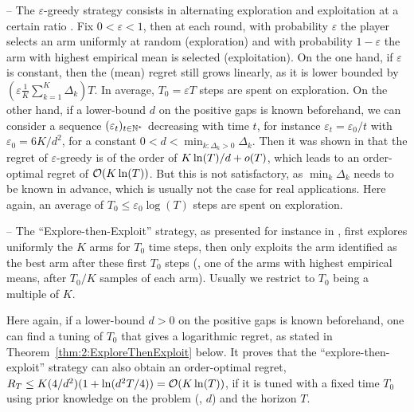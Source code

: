 -- The \textcolor{deeppurple}{$\varepsilon$-greedy strategy} consists in alternating exploration and exploitation at a certain ratio \cite{Auer02}.
Fix $0<\varepsilon<1$, then at each round, with probability $\varepsilon$ the player selects an arm uniformly at random (exploration) and with probability $1-\varepsilon$ the arm with highest empirical mean is selected (exploitation).
On the one hand, if $\varepsilon$ is constant, then the (mean) regret still grows linearly, as it is lower bounded by $(\varepsilon \frac{1}{K} \sum_{k=1}^K \Delta_k) T$.
In average, $T_0 = \varepsilon T$ steps are spent on exploration.
%
On the other hand, if a lower-bound $d$ on the positive gaps is known beforehand,
we can consider a sequence $(\varepsilon_t)_{t\in\mathbb{N}^*}$ decreasing with time $t$, for instance $\varepsilon_t = \varepsilon_0 / t$ with $\varepsilon_0 = 6 K / d^2$, for a constant $0 < d < \min_{k: \Delta_k > 0} \Delta_k$.
Then it was shown in \cite{Auer02} that the regret of $\varepsilon$-greedy is of the order of $K \ln(T) / d + \mathop{}\mathopen{}o\mathopen{}\left(T\right)$, which leads to an order-optimal regret of $\mathop{}\mathopen{}\mathcal{O}\mathopen{}\left(K \ln(T)\right)$.
But this is not satisfactory, as $\min_k \Delta_k$ needs to be known in advance, which is usually not the case for real applications.
Here again, an average of $T_0 \leq \varepsilon_0 \log(T)$ steps are spent on exploration.


-- The ``\textcolor{deepgold}{Explore-then-Exploit}'' strategy, as presented for instance in \cite{Bubeck12}, first explores uniformly the $K$ arms for $T_0$ time steps, then only exploits the arm identified as the best arm after these first $T_0$ steps
(\ie, one of the arms with highest empirical means, after $T_0/K$ samples of each arm).
Usually we restrict to $T_0$ being a multiple of $K$.

Here again, if a lower-bound $d>0$ on the positive gaps is known beforehand, one can find a tuning of $T_0$ that gives a logarithmic regret, as stated in Theorem~\ref{thm:2:ExploreThenExploit} below.
It proves that the ``explore-then-exploit'' strategy can also obtain an order-optimal regret, $R_T \leq K (4/d^2) (1 + \ln(d^2 T / 4)) = \mathop{}\mathopen{}\mathcal{O}\mathopen{}\left(K \ln(T)\right)$, if it is tuned with a fixed time $T_0$ using prior knowledge on the problem (\ie, $d$) and the horizon $T$.
%

